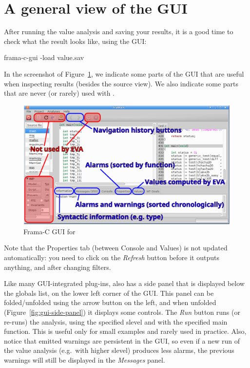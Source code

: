 \section{A general view of the GUI}

After running the value analysis and saving your results,
it is a good time to check what the result looks like, using the GUI:

\begin{frama-c-commands}
frama-c-gui -load value.sav
\end{frama-c-commands}

In the screenshot of Figure~\ref{fig:gui-eva},
we indicate some parts of the GUI that are
useful when inspecting \Eva{} results (besides the source view). We also
indicate some parts that are never (or rarely) used with \Eva{}.

\begin{figure}[hbt]
\centering
\includegraphics[width=\textwidth]{gui-images/gui1-annotated.pdf}
\caption{Frama-C GUI for \Eva{}}
\label{fig:gui-eva}
\end{figure}

Note that the Properties tab (between Console and Values) is not updated
automatically: you need to click on the \emph{Refresh} button before it
outputs anything, and after changing filters.

Like many GUI-integrated plug-ins, \Eva{} also has a side panel
that is displayed below the globals list, on the lower left corner of the GUI.
This panel can be folded/unfolded using the arrow button on the left,
and when unfolded (Figure~\ref{fig:gui-side-panel}) it displays some controls.
The {\em Run} button runs (or re-runs) the
analysis, using the specified slevel and with the specified main function.
This is useful only for small examples and rarely used in practice.
Also, notice that emitted warnings are persistent in the GUI, so even if a new
run of the value analysis (e.g.~with higher slevel) produces less alarms, the
previous warnings will still be displayed in the {\em Messages} panel.

